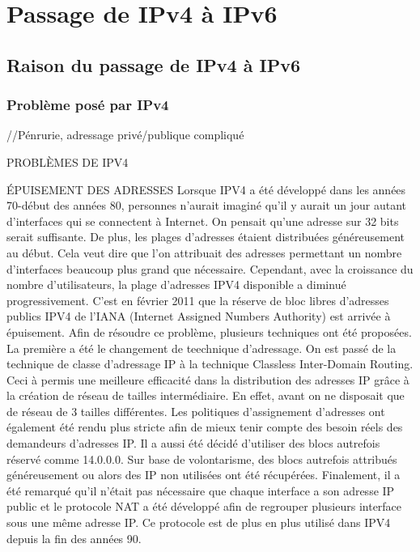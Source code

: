\documentclass[twoside,openright,a4paper,11pt,french]{article}
\begin{document}
\section{Passage de IPv4 à IPv6}
\subsection{Raison du passage de IPv4 à IPv6}
\subsubsection{Problème posé par IPv4}
//Pénrurie, adressage privé/publique compliqué

PROBLÈMES DE IPV4

ÉPUISEMENT DES ADRESSES
Lorsque IPV4 a été développé dans les années 70-début des années 80, personnes n'aurait imaginé qu'il y aurait un jour autant d'interfaces qui se connectent à Internet. On pensait qu'une adresse sur 32 bits serait suffisante. De plus, les plages d'adresses étaient distribuées généreusement au début. Cela veut dire que l'on attribuait des adresses permettant un nombre d'interfaces beaucoup plus grand que nécessaire.
Cependant, avec la croissance du nombre d'utilisateurs, la plage d'adresses IPV4 disponible a diminué progressivement. C'est en février 2011 que la réserve de bloc libres d'adresses publics IPV4 de l'IANA (Internet Assigned Numbers Authority) est arrivée à épuisement.
Afin de résoudre ce problème, plusieurs techniques ont été proposées.
La première a été le changement de teechnique d'adressage. On est passé de la technique de classe d'adressage IP à la technique Classless Inter-Domain Routing. Ceci à permis une meilleure efficacité dans la distribution des adresses IP grâce à la création de réseau de tailles intermédiaire. En effet, avant on ne disposait que de réseau de 3 tailles différentes.
Les politiques d'assignement d'adresses ont également été rendu plus stricte afin de mieux tenir compte des besoin réels des demandeurs d'adresses IP.
Il a aussi été décidé d'utiliser des blocs autrefois réservé comme 14.0.0.0.
Sur base de volontarisme, des blocs autrefois attribués généreusement ou alors des IP non utilisées ont été récupérées. 
Finalement, il a été remarqué qu'il n'était pas nécessaire que chaque interface a son adresse IP public et le protocole NAT a été développé afin de regrouper plusieurs interface sous une même adresse IP. Ce protocole est de plus en plus utilisé dans IPV4 depuis la fin des années 90.
\end{document}
